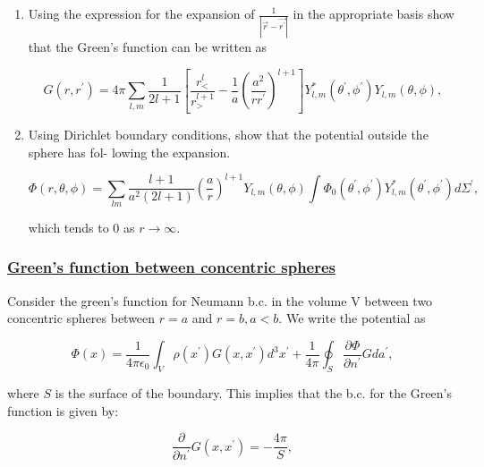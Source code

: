  \begin{enumerate}
	\item  Using the expression for the expansion of $\frac{1}{\left|\vec{r}-\vec{r^{\prime}}\right|}$ in the appropriate basis show that the Green's function can be written as
	
	\begin{equation}
		G\left(r, r^{\prime}\right)=4 \pi \sum_{l, m} \frac{1}{2 l+1}\left[\frac{r_{<}^{l}}{r_{>}^{l+1}}-\frac{1}{a}\left(\frac{a^{2}}{r r^{\prime}}\right)^{l+1}\right] Y_{l, m}^{*}\left(\theta^{\prime}, \phi^{\prime}\right) Y_{l, m}(\theta, \phi),
	\end{equation}

\item Using Dirichlet boundary conditions, show that the potential outside the sphere has fol- lowing the expansion.
	
\begin{equation}
	\Phi(r, \theta, \phi)=\sum_{l m}\frac{l+1}{a^{2} (2l+1)}\left(\frac{a}{r}\right)^{l+1} Y_{l, m}(\theta, \phi) \int \Phi_{0}\left(\theta^{\prime}, \phi^{\prime}\right) Y_{l, m}^{*}\left(\theta^{\prime}, \phi^{\prime}\right) d \Sigma^{\prime},
\end{equation}

which tends to 0 as $r \rightarrow \infty$.
\end{enumerate}

\subsubsection{\hyperref[Green's function between concentric spheres]{Green's function between concentric spheres}}

Consider the green's function for Neumann b.c. in the volume $\mathrm{V}$ between two concentric spheres between $r=a$ and $r=b, a<b$. We write the potential as

\begin{equation}
	\Phi(x)=\frac{1}{4 \pi \epsilon_{0}} \int_{V} \rho\left(x^{\prime}\right) G\left(x, x^{\prime}\right) d^{3} x^{\prime}+\frac{1}{4 \pi} \oint_{S} \frac{\partial \Phi}{\partial n^{\prime}} G d a^{\prime},
\end{equation}

where $S$ is the surface of the boundary. This implies that the b.c. for the Green's function is given by:

\begin{equation}
	\frac{\partial}{\partial n^{\prime}} G\left(x, x^{\prime}\right)=-\frac{4 \pi}{S},
\end{equation}

